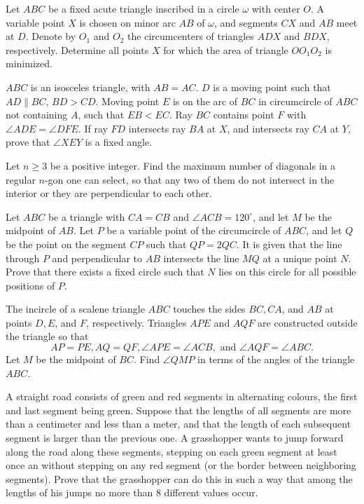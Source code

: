\documentclass[11pt]{scrartcl}
\begin{document}
\begin{problem}[213513857758059]
Let $ABC$ be a fixed acute triangle inscribed in a circle $\omega$ with center $O$. A variable point $X$ is chosen on minor arc $AB$ of $\omega$, and segments $CX$ and $AB$ meet at $D$. Denote by $O_1$ and $O_2$ the circumcenters of triangles $ADX$ and $BDX$, respectively. Determine all points $X$ for which the area of triangle $OO_1O_2$ is minimized.
\end{problem}
\begin{problem}[215375559035207]
$ABC$ is an isosceles triangle, with $AB=AC$. $D$ is a moving point such that $AD\parallel BC$, $BD>CD$. Moving point $E$ is on the arc of $BC$ in circumcircle of $ABC$ not containing $A$, such that $EB<EC$. Ray $BC$ contains point $F$ with $\angle ADE=\angle DFE$. If ray $FD$ intersects ray $BA$ at $X$, and intersects ray $CA$ at $Y$, prove that $\angle XEY$ is a fixed angle.
\end{problem}
\begin{problem}[218743543617334]
	Let $n \geq 3$ be a positive integer. Find the maximum number of diagonals in a regular $n$-gon one can select, so that any two of them do not intersect in the interior or they are perpendicular to each other.
\end{problem}
\begin{problem}[220345421587712]
Let $ABC$ be a triangle with $CA=CB$ and $\angle{ACB}=120^\circ$, and let $M$ be the midpoint of $AB$. Let $P$ be a variable point of the circumcircle of $ABC$, and let $Q$ be the point on the segment $CP$ such that $QP = 2QC$. It is given that the line through $P$ and perpendicular to $AB$ intersects the line $MQ$ at a unique point $N$.
Prove that there exists a fixed circle such that $N$ lies on this circle for all possible positions of $P$.
\end{problem}
\begin{problem}[221552874820768]
The incircle of a scalene triangle $ABC$ touches the sides $BC, CA$, and $AB$ at points $D, E$, and $F$, respectively. Triangles $APE$ and $AQF$ are constructed outside the triangle so that\[AP =PE, AQ=QF, \angle APE=\angle ACB,\text{ and }\angle AQF =\angle ABC.\]Let $M$ be the midpoint of $BC$. Find $\angle QMP$ in terms of the angles of the triangle $ABC$.
\end{problem}
\begin{problem}[221644122066923]
A straight road consists of green and red segments in alternating colours, the first and last segment being green. Suppose that the lengths of all segments are more than a centimeter and less than a meter, and that the length of each subsequent segment is larger than the previous one. A grasshopper wants to jump forward along the road along these segments, stepping on each green segment at least once an without stepping on any red segment (or the border between neighboring segments). Prove that the grasshopper can do this in such a way that among the lengths of his jumps no more than $8$ different values occur.
\end{problem}
\end{document}
